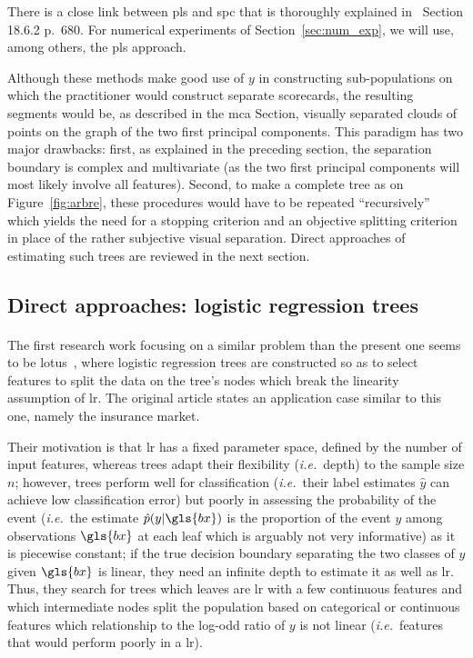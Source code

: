 There is a close link between \gls{pls} and \gls{spc} that is thoroughly explained in~\cite{friedman2001elements} Section 18.6.2 p.\ 680. For numerical experiments of Section~\ref{sec:num_exp}, we will use, among others, the \gls{pls} approach.

\medskip

Although these methods make good use of $y$ in constructing sub-populations on which the practitioner would construct separate scorecards, the resulting segments would be, as described in the \gls{mca} Section, visually separated clouds of points on the graph of the two first principal components. This paradigm has two major drawbacks: first, as explained in the preceding section, the separation boundary is complex and multivariate (as the two first principal components will most likely involve all features). Second, to make a complete tree as on Figure~\ref{fig:arbre}, these procedures would have to be repeated ``recursively'' which yields the need for a stopping criterion and an objective splitting criterion in place of the rather subjective visual separation. Direct approaches of estimating such trees are reviewed in the next section.

\subsection{Direct approaches: logistic regression trees} \label{subsec:direct}

\paragraph{}

The first research work focusing on a similar problem than the present one seems to be \gls{lotus}~\cite{chan2004lotus}, where logistic regression trees are constructed so as to select features to split the data on the tree's nodes which break the linearity assumption of \gls{lr}. The original article states an application case similar to this one, namely the insurance market.

Their motivation is that \gls{lr} has a fixed parameter space, defined by the number of input features, whereas trees adapt their flexibility (\textit{i.e.}\ depth) to the sample size $n$; however, trees perform well for classification (\textit{i.e.}\ their label estimates $\hat{y}$ can achieve low classification error) but poorly in assessing the probability of the event (\textit{i.e.}\ the estimate $\hat{p}(y | \gls{bx})$ is the proportion of the event $y$ among observations $\gls{bx}$ at each leaf which is arguably not very informative) as it is piecewise constant; if the true decision boundary separating the two classes of $y$ given $\gls{bx}$ is linear, they need an infinite depth to estimate it as well as \gls{lr}. Thus, they search for trees which leaves are \gls{lr} with a few continuous features and which intermediate nodes split the population based on categorical or continuous features which relationship to the log-odd ratio of $y$ is not linear (\textit{i.e.}\ features that would perform poorly in a \gls{lr}).

